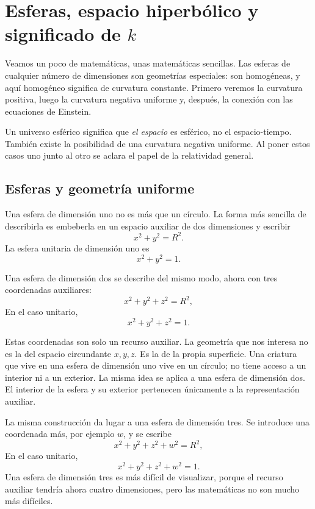 \chapter{Esferas, espacio hiperbólico y significado de \(k\)}

Veamos un poco de matemáticas, unas matemáticas sencillas. Las esferas de cualquier número de dimensiones son geometrías especiales: son homogéneas, y aquí homogéneo significa de curvatura constante. Primero veremos la curvatura positiva, luego la curvatura negativa uniforme y, después, la conexión con las ecuaciones de Einstein.

Un universo esférico significa que \emph{el espacio} es esférico, no el espacio-tiempo. También existe la posibilidad de una curvatura negativa uniforme. Al poner estos casos uno junto al otro se aclara el papel de la relatividad general.

\section{Esferas y geometría uniforme}

Una esfera de dimensión uno no es más que un círculo. La forma más sencilla de describirla es embeberla en un espacio auxiliar de dos dimensiones y escribir
\begin{equation}
x^2+y^2=R^2.
\end{equation}
La esfera unitaria de dimensión uno es
\begin{equation}
x^2+y^2=1.
\end{equation}

Una esfera de dimensión dos se describe del mismo modo, ahora con tres coordenadas auxiliares:
\begin{equation}
x^2+y^2+z^2=R^2,
\end{equation}
En el caso unitario,
\begin{equation}
x^2+y^2+z^2=1.
\end{equation}

Estas coordenadas son solo un recurso auxiliar. La geometría que nos interesa no es la del espacio circundante \(x,y,z\). Es la de la propia superficie. Una criatura que vive en una esfera de dimensión uno vive en un círculo; no tiene acceso a un interior ni a un exterior. La misma idea se aplica a una esfera de dimensión dos. El interior de la esfera y su exterior pertenecen únicamente a la representación auxiliar.

La misma construcción da lugar a una esfera de dimensión tres. Se introduce una coordenada más, por ejemplo \(w\), y se escribe
\begin{equation}
x^2+y^2+z^2+w^2=R^2,
\end{equation}
En el caso unitario,
\begin{equation}
x^2+y^2+z^2+w^2=1.
\end{equation}
Una esfera de dimensión tres es más difícil de visualizar, porque el recurso auxiliar tendría ahora cuatro dimensiones, pero las matemáticas no son mucho más difíciles.

